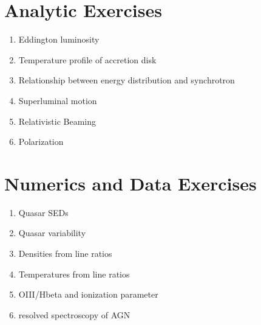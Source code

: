 \section{Analytic Exercises}

\begin{enumerate}
\item Eddington luminosity
\item Temperature profile of accretion disk
\item Relationship between energy distribution and synchrotron
\item Superluminal motion
\item Relativistic Beaming
\item Polarization
\end{enumerate}

\section{Numerics and Data Exercises}

\begin{enumerate}
\item Quasar SEDs
\item Quasar variability
\item Densities from line ratios
\item Temperatures from line ratios
\item OIII/Hbeta and ionization parameter
\item resolved spectroscopy of AGN
\end{enumerate}


  
